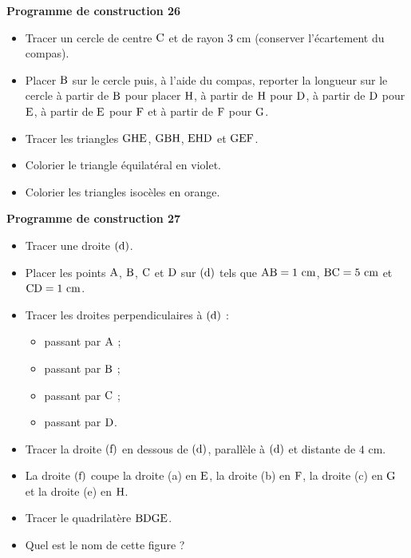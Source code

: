 \documentclass{article}
\begin{document}
\noindent\textbf{Programme de construction 26}\par\smallskip\noindent
\begin{itemize}
    \item Tracer un cercle de centre $\text{C}$ et de rayon
    $3\text{ cm}$ (conserver l'écartement du compas).
    \item Placer $\text{B}$ sur le cercle puis, à l'aide du compas,
    reporter la longueur sur le cercle à partir de $\text{B}$ pour
    placer $\text{H}$, à partir de $\text{H}$ pour
    $\text{D}$, à partir de $\text{D}$ pour
    $\text{E}$, à partir de $\text{E}$ pour
    $\text{F}$ et à partir de $\text{F}$ pour
    $\text{G}$.
    \item Tracer les triangles $\text{GHE}$, $\text{GBH}$,
    $\text{EHD}$ et $\text{GEF}$.
    \item Colorier le triangle équilatéral en violet.
    \item Colorier les triangles isocèles en orange.
\end{itemize}
\noindent\textbf{Programme de construction 27}\par\smallskip\noindent
\begin{itemize}
    \item Tracer une droite $(\text{d})$.
    \item Placer les points $\text{A}$, $\text{B}$,
    $\text{C}$ et $\text{D}$ sur $(\text{d})$ tels que
    $\text{AB}=1\text{ cm}$, $\text{BC}=5\text{ cm}$ et
    $\text{CD}=1\text{ cm}$.
    \item Tracer les droites perpendiculaires à $(\text{d})$ :
    \begin{itemize}
        \item[(a)] passant par $\text{A}$ ;
        \item[(b)] passant par $\text{B}$ ;
        \item[(c)] passant par $\text{C}$ ;
        \item[(e)] passant par $\text{D}$.
    \end{itemize}
    \item Tracer la droite $(\text{f})$ en dessous de
    $(\text{d})$, parallèle à $(\text{d})$ et distante de
    $4\text{ cm}$.
    \item La droite $(\text{f})$ coupe la droite (a) en
    $\text{E}$, la droite (b) en $\text{F}$, la droite (c) en
    $\text{G}$ et la droite (e) en $\text{H}$.
    \item Tracer le quadrilatère $\text{BDGE}$.
    \item Quel est le nom de cette figure ?
\end{itemize}
\end{document}
